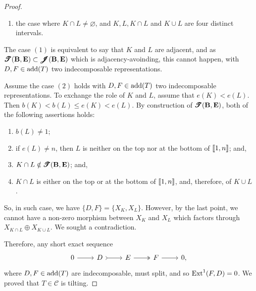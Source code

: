\begin{proof}
\begin{enumerate}[label=$(\arabic*)$,itemsep=1mm]
        \item the case where $K \cap L \neq \varnothing$, and $K,L,K\cap L$ and $K \cup L$ are four distinct intervals.
    \end{enumerate}
        The case $(1)$ is equivalent to say that $K$ and $L$ are adjacent, and as $\pmb{\mathscr{T}}(\mathbf B,\mathbf E) \subset \operatorname{\pmb{\mathscr{J}}}(\mathbf B,\mathbf E)$ which is adjacency-avoinding, this cannot happen, with $D,F \in \operatorname{add}(T)$ two indecomposable representations.
        
        Assume the case $(2)$ holds with $D,F \in \operatorname{add}(T)$ two indecomposable representations. To exchange the role of $K$ and $L$, assume that $e(K) < e(L)$. Then $b(K) < b(L) \leqslant e(K) < e(L)$. By construction of $\pmb{\mathscr{T}}(\mathbf B,\mathbf E)$, both of the following assertions holds:
        \begin{enumerate}[label=$\bullet$, itemsep=1mm]
            \item $b(L) \neq 1$;
            \item if $e(L) \neq n$, then $L$ is neither on the top nor at the bottom of $\llbracket 1,n \rrbracket$; and,
            \item $K \cap L \notin \pmb{\mathscr{T}}(\mathbf B,\mathbf E)$; and,
            \item $K \cap L$ is either on the top or at the bottom of $\llbracket 1,n \rrbracket$, and, therefore, of $K \cup L$.
        \end{enumerate}
         So, in such case, we have $\{D,F\} = \{X_{K}, X_{L}\}$. However, by the last point, we cannot have a non-zero morphism between $X_K$ and $X_L$ which factors through $X_{K \cap L} \oplus X_{K \cup L}$. We sought a contradiction. 
         
        Therefore, any short exact sequence  \[\begin{tikzcd}
	0 & D & E  & F &  0,
	\arrow[from=1-1, to=1-2]
	\arrow[tail, from=1-2, to=1-3]
	\arrow[two heads,from=1-3, to=1-4]
	\arrow[from=1-4, to=1-5]
\end{tikzcd}\] where $D,F \in \operatorname{add}(T)$ are indecomposable, must split, and so $\operatorname{Ext}^1(F, D) = 0$. We proved that $T \in \mathscr{C}$ is tilting.
\end{proof}

